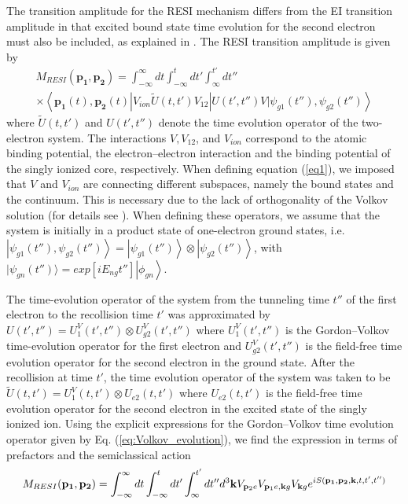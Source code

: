 \documentclass[11pt]{article}
\numberwithin{equation}{section}
\begin{document}
The transition amplitude for the RESI mechanism differs from the EI transition amplitude in that excited bound state time evolution for the second electron must also be included, as explained in \cite{a2011_electronelectron}. The RESI transition amplitude is given by 
\begin{multline} \label{eq1}
    M_{RESI}(\mathbf{p_1},\mathbf{p_2}) = \int_{-\infty}^{\infty}dt\int_{-\infty}^{t}dt'\int_{\infty}^{t'}dt'' \\
\times \left\langle\mathbf{p_1}(t),\mathbf{p_2}(t)|V_{ion}\tilde{U}(t,t')V_{12}|U(t',t'')V|\psi_{g1}(t''),\psi_{g2}(t'')\right\rangle
\end{multline}
where $\tilde{U}(t,t')$ and $U(t',t'')$ denote the time evolution operator of the two-electron system. The interactions $V, V_{12}$, and $V_{ion}$ correspond to the atomic binding potential, the electron–electron interaction and the binding potential of the singly ionized core, respectively.
\newline
When defining equation (\ref{eq1}), we imposed that $V$ and $V_{ion}$ are connecting different subspaces, namely the bound states and the continuum. This is necessary due to the lack of orthogonality of the Volkov solution (for details see \cite{a2011_electronelectron}). When defining these operators, we assume that the system is initially in a product state of one-electron ground states, i.e. $\left|\psi_{g1}(t''),\psi_{g2}(t'') \right\rangle = \left|\psi_{g1}(t'')\right\rangle \otimes  \left|\psi_{g2}(t'')\right\rangle$, with $|\psi_{gn}(t'')\rangle=exp[iE_{ng}t'']\left|\phi_{gn}\right\rangle$. 
\par
The time-evolution operator of the system from the tunneling time $t''$ of the first electron to the recollision time $t'$ was approximated by $U(t',t'') = U_1^V(t',t'') \otimes U_{g2}^V(t',t'')$ where $U_1^V(t',t'')$ is the Gordon–Volkov time-evolution operator for the first electron and $U_{g2}^V(t',t'')$ is the field-free time evolution operator for the second electron in the ground state. After the recollision at time $t'$, the time evolution operator of the system was taken to be $\tilde{U}(t,t') = U_1^V (t,t') \otimes U_{e2}(t,t')$ where  $U_{e2}(t,t')$ is the field-free time evolution operator for the second electron in the excited state of the singly ionized ion. Using the explicit expressions for the Gordon–Volkov time evolution operator given by Eq. (\ref{eq:Volkov_evolution}), we find the expression in terms of prefactors and the semiclassical action
\begin{equation} \label{eq2}
   M_{RESI}(\mathbf{p_1},\mathbf{p_2}) = \int_{-\infty}^{\infty}dt\int_{-\infty}^{t}dt'\int_{\infty}^{t'}dt''\\ d^3\mathbf{k} V_{\mathbf{p}_2e}V_{\mathbf{p}_1e,\mathbf{k}g}V_{\mathbf{k}g}
   e^{iS(\mathbf{p_1},\mathbf{p_2},\mathbf{k},t,t',t'')}
\end{equation}
\end{document}
